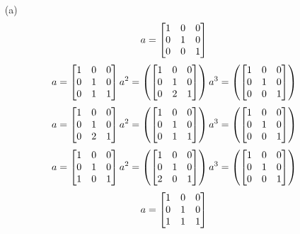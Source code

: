 \begin{mdframed}[style=darkAnswer,frametitle={Joe Starr}]
  \begin{itemize}\item[(a)]{
$$
a= \begin{bmatrix}1&0&0\\0&1&0\\0&0&1\end{bmatrix} \\
$$ $$
a= \begin{bmatrix}1&0&0\\0&1&0\\0&1&1\end{bmatrix} \\
a^{ 2 }=\left( \begin{bmatrix}1&0&0\\0&1&0\\0&2&1\end{bmatrix} \right)
a^{ 3 }=\left( \begin{bmatrix}1&0&0\\0&1&0\\0&0&1\end{bmatrix} \right)
$$ $$
a= \begin{bmatrix}1&0&0\\0&1&0\\0&2&1\end{bmatrix} \\
a^{ 2 }=\left( \begin{bmatrix}1&0&0\\0&1&0\\0&1&1\end{bmatrix} \right)
a^{ 3 }=\left( \begin{bmatrix}1&0&0\\0&1&0\\0&0&1\end{bmatrix} \right)
$$ $$
a= \begin{bmatrix}1&0&0\\0&1&0\\1&0&1\end{bmatrix} \\
a^{ 2 }=\left( \begin{bmatrix}1&0&0\\0&1&0\\2&0&1\end{bmatrix} \right)
a^{ 3 }=\left( \begin{bmatrix}1&0&0\\0&1&0\\0&0&1\end{bmatrix} \right)
$$ $$
a= \begin{bmatrix}1&0&0\\0&1&0\\1&1&1\end{bmatrix} \\
$$}
\end{itemize}
\end{mdframed}
